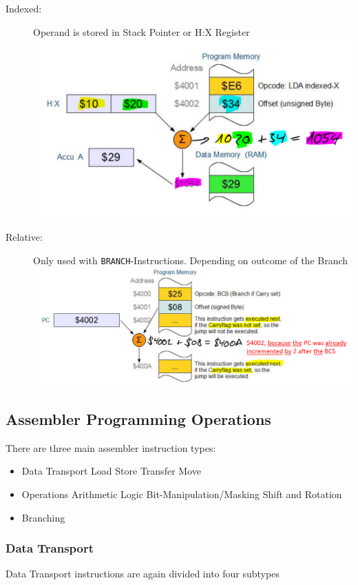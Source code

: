 \documentclass[a4paper, 11pt, nofootinbib]{article}
\newcommand{\code}[1]{\texttt{#1}}
\begin{document}
\begin{description}
	\item[Indexed: ] Operand is stored in Stack Pointer or H:X Register \\
		\includegraphics[keepaspectratio=true, height=10\baselineskip]{indAdd.PNG}
	\item[Relative: ] Only used with \code{BRANCH}-Instructions. Depending on outcome of the Branch \\
		\includegraphics[keepaspectratio=true, height=10\baselineskip]{relAdd.PNG}
\end{description}

\subsection{Assembler Programming Operations}
There are three main assembler instruction types:

\begin{itemize}
	\item Data Transport
		\subitem Load
		\subitem Store
		\subitem Transfer
		\subitem Move
	\item Operations
		\subitem Arithmetic
		\subitem Logic
		\subitem Bit-Manipulation/Masking
		\subitem Shift and Rotation
	\item Branching
\end{itemize}

\subsubsection{Data Transport}
Data Transport instructions are again divided into four subtypes
\end{document}
